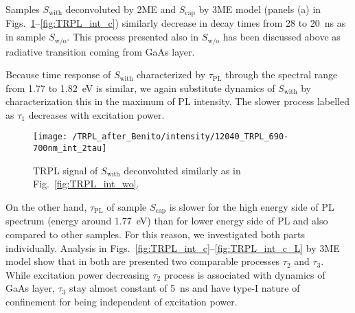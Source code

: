 


Samples $S_\mathrm{with}$ deconvoluted by 2ME and $S_\mathrm{cap}$ by 3ME model (panels (a) in Figs.~\ref{fig:TRPL_int_w}--\ref{fig:TRPL_int_c}) similarly decrease in decay times from 28 to 20~ns as in sample $S_\mathrm{w/o}$. This process presented also in $S_\mathrm{w/o}$ has been discussed above as radiative transition coming from GaAs layer.
%

Because time response of $S_\mathrm{with}$ characterized by $\tau_\mathrm{PL}$ through the spectral range from 1.77 to 1.82~eV is similar, we again substitute dynamics of $S_\mathrm{with}$ by characterization this in the maximum of PL intensity. The slower process labelled as $\tau_1$ decreases with excitation power. {\color{red}{(TADY se musime domluvit, co to teda ma byt. Navrhy PS: 1) ovlivnena ta GaAs vrstva - na tomto vzorku by vubec nebyly tecky a jen pri snaze je narust, by se rozsirila tloustka te GaAs vrstvy a prineslo by to do ni trosku india. Coz by posunulo PL k nizsim energiim? a mohlo by to protahnout rakombinacni cas.

2) InGaAs QD typu II s dlouhou dobou zivota, ktera se ale ovlivnuje s excitaci a tim se zrychluje. ) }}
%
\begin{figure}
	\centering
	\texttt{[image: /TRPL\_after\_Benito/intensity/12040\_TRPL\_690-700nm\_int\_2tau]} %
	\caption{TRPL signal of $S_\mathrm{with}$ deconvoluted similarly as in Fig.~\ref{fig:TRPL_int_wo}.}
	\label{fig:TRPL_int_w}
\end{figure}



On the other hand, $\tau_\mathrm{PL}$ of sample $S_\mathrm{cap}$ is slower for the high energy side of PL spectrum (energy around 1.77~eV) than for lower energy side of PL and also compared to other samples. For this reason, we investigated both parts individually. Analysis in Figs.~\ref{fig:TRPL_int_c}--\ref{fig:TRPL_int_c_L} by 3ME model show that in both are presented two comparable processes $\tau_2$ and $\tau_3$. While excitation power decreasing $\tau_2$ process is associated with dynamics of GaAs layer, $\tau_3$ stay almost constant of 
5~ns and have type-I nature of confinement for being independent of excitation power.  {\color{red}{(máš nějakou referenci, ja nemuzu nic najit)}}





